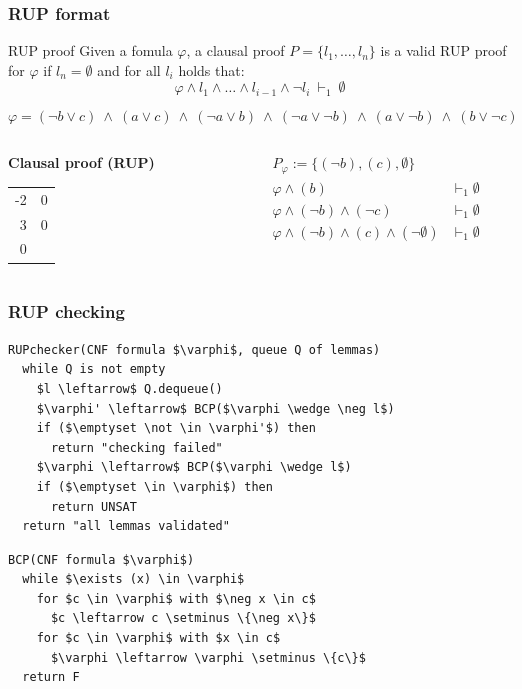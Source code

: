 \documentclass[xcolor=dvipsnames]{beamer}
\begin{document}
\begin{frame}
  \frametitle{RUP format}
    \begin{block}{RUP proof}
        Given a fomula $\varphi$, a clausal proof $P = \{l_1, \dots, l_n\}$ is a valid RUP proof for $\varphi$ if $l_n = \emptyset$ and for all $l_i$ holds that:
    \[
        \varphi \wedge l_1 \wedge \dots \wedge l_{i -1} \wedge \neg l_i ~\vdash_1~ \emptyset
    \]
    \end{block}

	\pause
    \[
        \varphi = (\neg b \vee c) ~\wedge~ (a \vee c) ~\wedge~
                  (\neg a \vee b) ~\wedge~ (\neg a \vee \neg b) ~\wedge~
                  (a \vee \neg b) ~\wedge~ (b \vee \neg c)
    \]
	\begin{columns}
	\begin{column}{0.5\textwidth}
        \textbf{Clausal proof (RUP)}
        \begin{table}
		\begin{tabular}{rr}
		 -2 & 0  \\
		  3 & 0  \\
          0 \\
        \end{tabular}
		\end{table}
	\end{column}
	\begin{column}{0.5\textwidth}
        \begin{align*}
            & P_\varphi := \{ (\neg b), (c), \emptyset \} \\
            & \varphi \wedge (b) & \vdash_1 \emptyset \\
            & \varphi \wedge (\neg b) \wedge ( \neg c ) & \vdash_1 \emptyset \\
            & \varphi \wedge (\neg b) \wedge (c) \wedge (\neg \emptyset) & \vdash_1 \emptyset \\
        \end{align*}
    \end{column}
	\end{columns}

\end{frame}

\begin{frame}[fragile]
  \frametitle{RUP checking}

\begin{lstlisting}
RUPchecker(CNF formula $\varphi$, queue Q of lemmas)
  while Q is not empty
    $l \leftarrow$ Q.dequeue()
    $\varphi' \leftarrow$ BCP($\varphi \wedge \neg l$)
    if ($\emptyset \not \in \varphi'$) then
      return "checking failed"
    $\varphi \leftarrow$ BCP($\varphi \wedge l$)
    if ($\emptyset \in \varphi$) then
      return UNSAT
  return "all lemmas validated"
\end{lstlisting}

\begin{lstlisting}
BCP(CNF formula $\varphi$)
  while $\exists (x) \in \varphi$
    for $c \in \varphi$ with $\neg x \in c$
      $c \leftarrow c \setminus \{\neg x\}$
    for $c \in \varphi$ with $x \in c$
      $\varphi \leftarrow \varphi \setminus \{c\}$
  return F
\end{lstlisting}
\end{frame}
\end{document}
